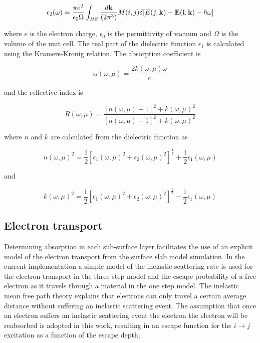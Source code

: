 \documentclass[a4paper,11pt,twoside]{book}
\begin{document}
\begin{equation}
\epsilon_2(\omega) = \frac{\pi e^2}{\epsilon_0 \Omega} \int_{BZ} \frac{d {\bf{k}}}{(2\pi^3)} M(i,j)  \delta[E(j,\bf{k}) -E(i,\bf{k})-\hbar \omega]
    \label{dielectric}
\end{equation}

where $e$ is the electron charge, $\epsilon_0$ is the permittivity of vacuum and $\Omega$ is the volume of the unit cell. The real part of the dielectric function $\epsilon_1$ is calculated using the Kramers-Kronig relation. The absorption coefficient is

\begin{equation}
\alpha(\omega,\mu) = \frac{2k(\omega, \mu)\omega}{c}
    \label{absorption}
\end{equation}

and the reflective index is

\begin{equation}
R(\omega,\mu) = \frac{[n(\omega, \mu)-1]^2+k(\omega, \mu)^2}{[n(\omega, \mu)+1]^2+k(\omega, \mu)^2}
    \label{reflectivity}
\end{equation}

where $n$ and $k$ are calculated from the dielectric function as

\begin{equation}
n(\omega, \mu)^2 = \frac{1}{2}[\epsilon_1(\omega, \mu)^2 + \epsilon_2(\omega, \mu)^2]^\frac{1}{2}+\frac{1}{2}\epsilon_1(\omega, \mu)
    \label{reflectivity}
\end{equation}

and

\begin{equation}
k(\omega, \mu)^2 = \frac{1}{2}[\epsilon_1(\omega, \mu)^2 + \epsilon_2(\omega, \mu)^2]^\frac{1}{2}-\frac{1}{2}\epsilon_1(\omega, \mu)
    \label{reflectivity}
\end{equation}

\subsection{Electron transport}
Determining absorption in each sub-surface layer facilitates the use of an explicit model of the electron transport from the surface slab model simulation. In the current implementation a simple model of the inelastic scattering rate is used for the electron transport in the three step model and the escape probability of a free electron as it travels through a material in the one step model. The inelastic mean free path theory explains that electrons can only travel a certain average distance without suffering an inelastic scattering event. The assumption that once an electron suffers an inelastic scattering event the electron the electron will be reabsorbed is adopted in this work, resulting in an escape function for the $i \rightarrow j$ excitation as a function of the escape depth;
\end{document}
